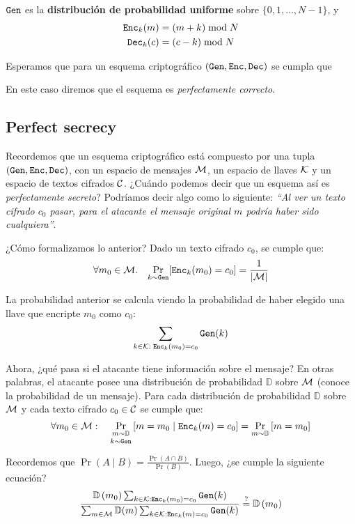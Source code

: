 $\texttt{Gen}$ es la \textbf{distribución de probabilidad uniforme} sobre $\{0,1,\ldots, N - 1 \}$, y
\begin{align*}
    \texttt{Enc}_k(m) & =(m+k) \bmod N \\
    \texttt{Dec}_k(c) & =(c-k) \bmod N
\end{align*}

Esperamos que para un esquema criptográfico $(\texttt{Gen}, \texttt{Enc}, \texttt{Dec})$ se cumpla que

En este caso diremos que el esquema es \textit{perfectamente correcto}.

\subsection{Perfect secrecy}

Recordemos que un esquema criptográfico está compuesto por una tupla $(\texttt{Gen}, \texttt{Enc}, \texttt{Dec})$, con un espacio de mensajes $\mathcal{M}$, un espacio de llaves $\mathcal{K}$ y un espacio de textos cifrados $\mathcal{C}$. ¿Cuándo podemos decir que un esquema así es \textit{perfectamente secreto}? Podríamos decir algo como lo siguiente: \textit{``Al ver un texto cifrado $c_0$ pasar, para el atacante el mensaje original $m$ podría haber sido cualquiera''}. \medbreak

¿Cómo formalizamos lo anterior? Dado un texto cifrado $c_0$, se cumple que:
$$
    \forall m_0 \in \mathcal{M}.\quad \underset{k \sim \texttt{Gen}}{\Pr}[\texttt{Enc}_k(m_0) = c_0] = \frac{1}{|\mathcal{M}|}
$$

La probabilidad anterior se calcula viendo la probabilidad de haber elegido una llave que encripte $m_0$ como $c_0$:
$$
    \sum_{k\in \mathcal{K}:\; \texttt{Enc}_k(m_0) = c_0} \texttt{Gen}(k)
$$

Ahora, ¿qué pasa si el atacante tiene información sobre el mensaje? En otras palabras, el atacante posee una distribución de probabilidad $\mathbb{D}$ sobre $\mathcal{M}$ (conoce la probabilidad de un mensaje). Para cada distribución de probabilidad $\mathbb{D}$ sobre $\mathcal{M}$ y cada texto cifrado $c_0 \in \mathcal{C}$ se cumple que:
$$
    \forall m_0 \in \mathcal{M}: \quad \Pr_{\substack{m \sim \mathbb{D} \\[2pt] k \sim \texttt{Gen}}}\left[m=m_0 \mid \texttt{Enc}_k(m)=c_0\right]=\Pr_{m \sim \mathbb{D}}\left[m=m_0\right]
$$

Recordemos que $\Pr(A \mid B)=\frac{\Pr(A \cap B)}{\Pr(B)}$. Luego, ¿se cumple la siguiente ecuación?
$$
    \frac{\mathbb{D}\left(m_0\right) \sum_{k \in \mathcal{K}: \texttt{Enc}_k\left(m_0\right)=c_0} \texttt{Gen}(k)}{\sum_{m \in \mathcal{M}} \mathbb{D}(m) \sum_{k \in \mathcal{K}: \texttt{Enc}_k(m)=c_0} \texttt{Gen}(k)} \stackrel{?}{=} \mathbb{D}\left(m_0\right)
$$

